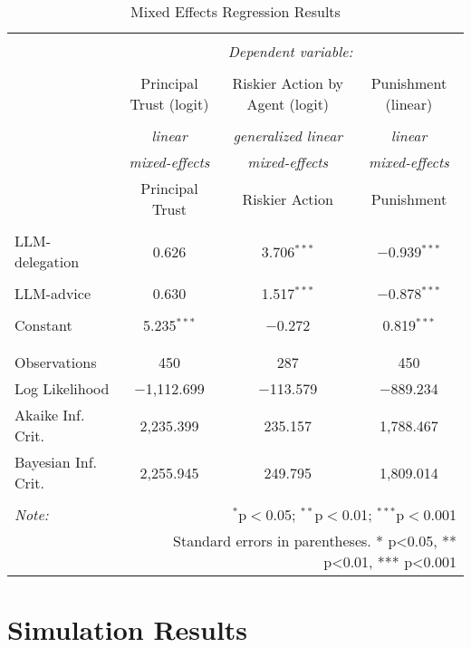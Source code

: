 \documentclass[
]{article}
\begin{document}
\begin{table}[!htbp] \centering 
  \caption{Mixed Effects Regression Results} 
  \label{} 
\begin{tabular}{@{\extracolsep{5pt}}lccc} 
\\[-1.8ex]\hline 
\hline \\[-1.8ex] 
 & \multicolumn{3}{c}{\textit{Dependent variable:}} \\ 
\cline{2-4} 
\\[-1.8ex] & Principal Trust (logit) & Riskier Action by Agent (logit) & Punishment (linear) \\ 
\\[-1.8ex] & \textit{linear} & \textit{generalized linear} & \textit{linear} \\ 
 & \textit{mixed-effects} & \textit{mixed-effects} & \textit{mixed-effects} \\ 
 & Principal Trust & Riskier Action & Punishment \\ 
\hline \\[-1.8ex] 
 LLM-delegation & 0.626 & 3.706$^{***}$ & $-$0.939$^{***}$ \\ 
  & & & \\ 
 LLM-advice & 0.630 & 1.517$^{***}$ & $-$0.878$^{***}$ \\ 
  & & & \\ 
 Constant & 5.235$^{***}$ & $-$0.272 & 0.819$^{***}$ \\ 
  & & & \\ 
\hline \\[-1.8ex] 
Observations & 450 & 287 & 450 \\ 
Log Likelihood & $-$1,112.699 & $-$113.579 & $-$889.234 \\ 
Akaike Inf. Crit. & 2,235.399 & 235.157 & 1,788.467 \\ 
Bayesian Inf. Crit. & 2,255.945 & 249.795 & 1,809.014 \\ 
\hline 
\hline \\[-1.8ex] 
\textit{Note:}  & \multicolumn{3}{r}{$^{*}$p$<$0.05; $^{**}$p$<$0.01; $^{***}$p$<$0.001} \\ 
 & \multicolumn{3}{r}{Standard errors in parentheses. * p<0.05, ** p<0.01, *** p<0.001} \\ 
\end{tabular} 
\end{table}

\section{Simulation Results}\label{simulation-results}
\end{document}
